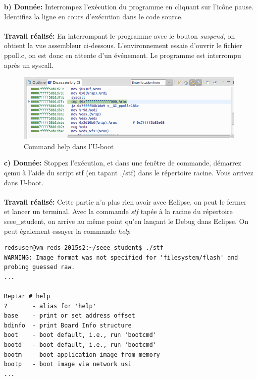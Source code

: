 \textbf{b) Donnée: } Interrompez l'exécution du programme en cliquant sur l'icône pause. Identifiez la ligne en cours d'exécution dans le code source. \\\\
\textbf{Travail réalisé: }En interrompant le programme avec le bouton \textit{suspend}, on obtient la vue assembleur ci-dessous. L'environnement essaie d'ouvrir le fichier ppoll.c, on est donc en attente d'un événement. Le programme est interrompu après un syscall.
\begin{figure}[H]
	\begin{center}
		\includegraphics[width=18cm]{img/ubootAsm.png}
		\caption{Command help dans l'U-boot}
		\label{ubootAsm}
	\end{center}
\end{figure}
\textbf{c) Donnée: } Stoppez l'exécution, et dans une fenêtre de commande, démarrez qemu à l'aide du script stf (en
tapant ./stf) dans le répertoire racine. Vous arrivez dans U-boot. \\\\
\textbf{Travail réalisé: }Cette partie n'a plus rien avoir avec Eclipse, on peut le fermer et lancer un terminal.
Avec la commande \textit{stf} tapée à la racine du répertoire seee\_student, on arrive au même point qu'en lançant le Debug dans Eclipse. On peut également essayer la commande \textit{help}
\begin{lstlisting}
redsuser@vm-reds-2015s2:~/seee_student$ ./stf
WARNING: Image format was not specified for 'filesystem/flash' and probing guessed raw.
...

Reptar # help
?       - alias for 'help'
base    - print or set address offset
bdinfo  - print Board Info structure
boot    - boot default, i.e., run 'bootcmd'
bootd   - boot default, i.e., run 'bootcmd'
bootm   - boot application image from memory
bootp   - boot image via network usi
...
\end{lstlisting}
